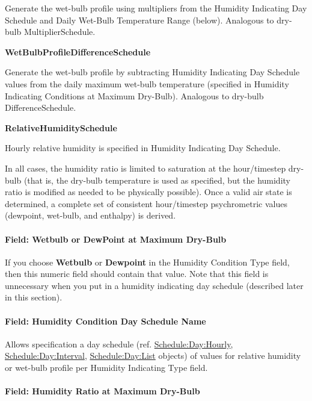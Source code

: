 Generate the wet-bulb profile using multipliers from the Humidity Indicating Day Schedule and Daily Wet-Bulb Temperature Range (below). Analogous to dry-bulb MultiplierSchedule.

\textbf{WetBulbProfileDifferenceSchedule}

Generate the wet-bulb profile by subtracting Humidity Indicating Day Schedule values from the daily maximum wet-bulb temperature (specified in Humidity Indicating Conditions at Maximum Dry-Bulb). Analogous to dry-bulb DifferenceSchedule.

\textbf{RelativeHumiditySchedule}

Hourly relative humidity is specified in Humidity Indicating Day Schedule.

In all cases, the humidity ratio is limited to saturation at the hour/timestep dry-bulb (that is, the dry-bulb temperature is used as specified, but the humidity ratio is modified as needed to be physically possible). Once a valid air state is determined, a complete set of consistent hour/timestep psychrometric values (dewpoint, wet-bulb, and enthalpy) is derived.

\paragraph{Field: Wetbulb or DewPoint at Maximum Dry-Bulb}\label{field-wetbulb-or-dewpoint-at-maximum-dry-bulb}

If you choose \textbf{Wetbulb} or \textbf{Dewpoint} in the Humidity Condition Type field, then this numeric field should contain that value. Note that this field is unnecessary when you put in a humidity indicating day schedule (described later in this section).

\paragraph{Field: Humidity Condition Day Schedule Name}\label{field-humidity-condition-day-schedule-name}

Allows specification a day schedule (ref. \hyperref[scheduledayhourly]{Schedule:Day:Hourly}, \hyperref[scheduledayinterval]{Schedule:Day:Interval}, \hyperref[scheduledaylist]{Schedule:Day:List} objects) of values for relative humidity or wet-bulb profile per Humidity Indicating Type field.

\paragraph{Field: Humidity Ratio at Maximum Dry-Bulb}\label{field-humidity-ratio-at-maximum-dry-bulb}

